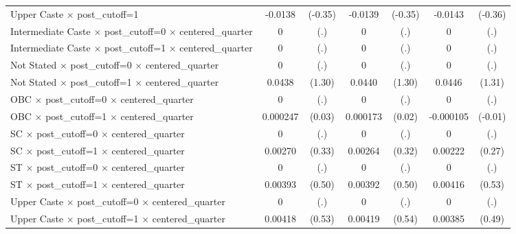 {\begin{tabular}{l*{3}{cc}}
Upper Caste $\times$ post\_cutoff=1&     -0.0138         &     (-0.35)&     -0.0139         &     (-0.35)&     -0.0143         &     (-0.36)\\
Intermediate Caste $\times$ post\_cutoff=0 $\times$ centered\_quarter&           0         &         (.)&           0         &         (.)&           0         &         (.)\\
Intermediate Caste $\times$ post\_cutoff=1 $\times$ centered\_quarter&           0         &         (.)&           0         &         (.)&           0         &         (.)\\
Not Stated $\times$ post\_cutoff=0 $\times$ centered\_quarter&           0         &         (.)&           0         &         (.)&           0         &         (.)\\
Not Stated $\times$ post\_cutoff=1 $\times$ centered\_quarter&      0.0438         &      (1.30)&      0.0440         &      (1.30)&      0.0446         &      (1.31)\\
OBC $\times$ post\_cutoff=0 $\times$ centered\_quarter&           0         &         (.)&           0         &         (.)&           0         &         (.)\\
OBC $\times$ post\_cutoff=1 $\times$ centered\_quarter&    0.000247         &      (0.03)&    0.000173         &      (0.02)&   -0.000105         &     (-0.01)\\
SC $\times$ post\_cutoff=0 $\times$ centered\_quarter&           0         &         (.)&           0         &         (.)&           0         &         (.)\\
SC $\times$ post\_cutoff=1 $\times$ centered\_quarter&     0.00270         &      (0.33)&     0.00264         &      (0.32)&     0.00222         &      (0.27)\\
ST $\times$ post\_cutoff=0 $\times$ centered\_quarter&           0         &         (.)&           0         &         (.)&           0         &         (.)\\
ST $\times$ post\_cutoff=1 $\times$ centered\_quarter&     0.00393         &      (0.50)&     0.00392         &      (0.50)&     0.00416         &      (0.53)\\
Upper Caste $\times$ post\_cutoff=0 $\times$ centered\_quarter&           0         &         (.)&           0         &         (.)&           0         &         (.)\\
Upper Caste $\times$ post\_cutoff=1 $\times$ centered\_quarter&     0.00418         &      (0.53)&     0.00419         &      (0.54)&     0.00385         &      (0.49)\\

\end{tabular}}
